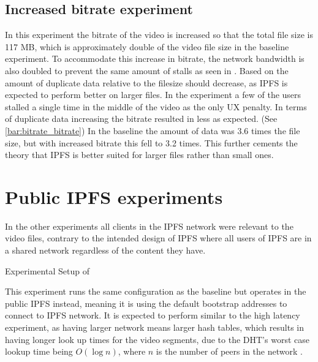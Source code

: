 \subsection{Increased bitrate experiment}
In this experiment the bitrate of the video is increased so that the total file size is 117 \ac{MB}, which is approximately double of the video file size in the baseline experiment. To accommodate this increase in bitrate, the network bandwidth is also doubled to prevent the same amount of stalls as seen in . Based on  the amount of duplicate data relative to the filesize should decrease, as \ac{IPFS} is expected to perform better on larger files.
In the experiment a few of the users stalled a single time in the middle of the video as the only \ac{UX} penalty. In terms of duplicate data increasing the bitrate resulted in less as expected. (See \autoref{bar:bitrate_bitrate}) In the baseline the amount of data was 3.6 times the file size, but with increased bitrate this fell to 3.2 times. This further cements the theory that \ac{IPFS} is better suited for larger files rather than small ones.

\if{}

\fi

\FloatBarrier \section{Public IPFS experiments}
\label{sec:eval_public}

In the other experiments all clients in the \ac{IPFS} network were relevant to the video files, contrary to the intended design of \ac{IPFS} where all users of \ac{IPFS} are in a shared network regardless of the content they have.

\begin{table}[!htbp]
    \myfloatalign
    \caption[Experimental Setup of Public Network]{Experimental Setup of }
    \label{tab:exp_overview_global}
    
\end{table}

This experiment runs the same configuration as the baseline but operates in the public \ac{IPFS} instead, meaning it is using the default bootstrap addresses to connect to \ac{IPFS} network.
It is expected to perform similar to the high latency experiment, as having larger network means larger hash tables, which results in having longer look up times for the video segments, due to the \ac{DHT}'s worst case lookup time being $ O ( \log n)$, where $n$ is the number of peers in the network \cite[p.2]{benet2014ipfs}.


